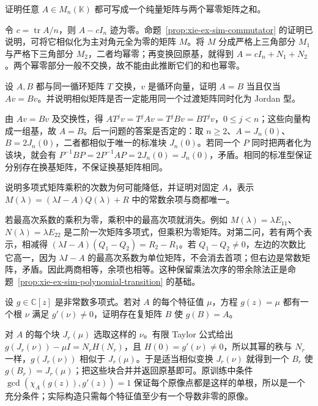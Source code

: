 \begin{example}
证明任意 $A\in M_n(\mathbb K)$ 都可写成一个纯量矩阵与两个幂零矩阵之和。
\end{example}
\begin{solve}
令 $c=\operatorname{tr}A/n$，则 $A-cI_n$ 迹为零。命题~\ref{prop:xie-ex-sim-commutator} 的证明已说明，可将它相似化为主对角元全为零的矩阵 $M$。将 $M$ 分成严格上三角部分 $M_1$ 与严格下三角部分 $M_2$，二者均幂零；再变换回原基，就得到 $A=cI_n+N_1+N_2$。两个幂零部分一般不交换，故不能由此推断它们的和也幂零。
\end{solve}

\begin{example}
设 $A,B$ 都与同一循环矩阵 $T$ 交换，$v$ 是循环向量，证明 $A=B$ 当且仅当 $Av=Bv$。并说明相似矩阵是否一定能用同一个过渡矩阵同时化为 Jordan 型。
\end{example}
\begin{solve}
由 $Av=Bv$ 及交换性，得 $AT^jv=T^jAv=T^jBv=BT^jv$，$0\leq j<n$；这些向量构成一组基，故 $A=B$。后一问题的答案是否定的：取 $n\geq2$、$A=J_n(0)$、$B=2J_n(0)$，二者都相似于唯一的标准块 $J_n(0)$。若同一个 $P$ 同时把两者化为该块，就会有 $P^{-1}BP=2P^{-1}AP=2J_n(0)=J_n(0)$，矛盾。相同的标准型保证分别存在换基矩阵，不保证换基矩阵相同。
\end{solve}

\begin{example}
说明多项式矩阵乘积的次数为何可能降低，并证明对固定 $A$，表示 $M(\lambda)=(\lambda I-A)Q(\lambda)+R$ 中的常数余项与商都唯一。
\end{example}
\begin{solve}
若最高次系数的乘积为零，乘积中的最高次项就消失。例如 $M(\lambda)=\lambda E_{11}$、$N(\lambda)=\lambda E_{22}$ 是二阶一次矩阵多项式，但乘积为零矩阵。对第二问，若有两个表示，相减得 $(\lambda I-A)(Q_1-Q_2)=R_2-R_1$。若 $Q_1-Q_2\ne0$，左边的次数比它高一，因为 $\lambda I-A$ 的最高次系数为单位矩阵，不会消去首项；但右边是常数矩阵，矛盾。因此两商相等，余项也相等。这种保留乘法次序的带余除法正是命题~\ref{prop:xie-ex-sim-polynomial-transition} 的基础。
\end{solve}

\begin{example}
设 $g\in\mathbb C[z]$ 是非常数多项式。若对 $A$ 的每个特征值 $\mu$，方程 $g(z)=\mu$ 都有一个根 $\nu$ 满足 $g'(\nu)\ne0$，证明存在复矩阵 $B$ 使 $g(B)=A$。
\end{example}
\begin{solve}
对 $A$ 的每个块 $J_r(\mu)$ 选取这样的 $\nu$。有限 Taylor 公式给出 $g(J_r(\nu))-\mu I=N_rH(N_r)$，且 $H(0)=g'(\nu)\ne0$，所以其幂的秩与 $N_r$ 一样，$g(J_r(\nu))$ 相似于 $J_r(\mu)$。于是适当相似变换 $J_r(\nu)$ 就得到一个 $B_r$ 使 $g(B_r)=J_r(\mu)$；把这些块合并并返回原基即可。原训练中条件 $\gcd(\chi_A(g(z)),g'(z))=1$ 保证每个原像点都是这样的单根，所以是一个充分条件；实际构造只需每个特征值至少有一个导数非零的原像。
\end{solve}

